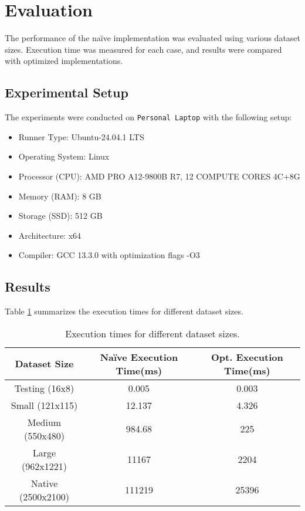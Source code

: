 \documentclass[12pt]{article}
\begin{document}
\section{Evaluation}
The performance of the naïve implementation was evaluated using various dataset sizes. Execution time was measured for each case, and results were compared with optimized implementations.

\subsection{Experimental Setup}
The experiments were conducted on \texttt{Personal Laptop} with the following setup:
\begin{itemize}
    \item Runner Type: Ubuntu-24.04.1 LTS
    \item Operating System: Linux
    \item Processor (CPU): AMD PRO A12-9800B R7, 12 COMPUTE CORES 4C+8G
    \item Memory (RAM): 8 GB
    \item Storage (SSD): 512 GB
    \item Architecture: x64
    \item Compiler: GCC 13.3.0 with optimization flags -O3
\end{itemize}

\subsection{Results}
Table \ref{tab:results} summarizes the execution times for different dataset sizes.

\begin{table}[h]
    \begin{tabular}{|c|c|c|}
        \hline
        \textbf{Dataset Size} & \textbf{Naïve Execution Time(ms)} & \textbf{Opt. Execution Time(ms)} \\
        \hline
        Testing (16x8) & 0.005 & 0.003 \\
        Small (121x115) & 12.137 & 4.326 \\
        Medium (550x480) & 984.68 & 225 \\
        Large (962x1221) & 11167 & 2204 \\
        Native (2500x2100) & 111219 & 25396 \\
        \hline
    \end{tabular}
        \caption{Execution times for different dataset sizes.}
        \label{tab:results}
    \end{table}
\end{document}
